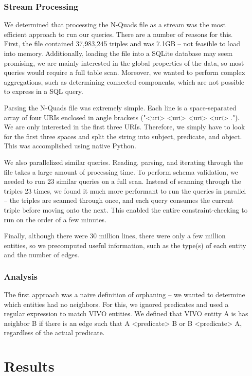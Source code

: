 \documentclass[11pt]{article}
\begin{document}
\subsubsection*{Stream Processing}
We determined that processing the N-Quads file as a stream was the most efficient approach to run our queries. There are a number of reasons for this. First, the file contained 37,983,245 triples and was 7.1GB -- not feasible to load into memory. Additionally, loading the file into a SQLite database may seem promising, we are mainly interested in the global properties of the data, so most queries would require a full table scan. Moreover, we wanted to perform complex aggregations, such as determining connected components, which are not possible to express in a SQL query.

Parsing the N-Quads file was extremely simple. Each line is a space-separated array of four URIs enclosed in angle brackets ("<uri> <uri> <uri> <uri> ."). We are only interested in the first three URIs. Therefore, we simply have to look for the first three spaces and split the string into subject, predicate, and object. This was accomplished using native Python.

We also parallelized similar queries. Reading, parsing, and iterating through the file takes a large amount of processing time. To perform schema validation, we needed to run 23 similar queries on a full scan. Instead of scanning through the triples 23 times, we found it much more performant to run the queries in parallel -- the triples are scanned through once, and each query consumes the current triple before moving onto the next. This enabled the entire constraint-checking to run on the order of a few minutes.

Finally, although there were 30 million lines, there were only a few million entities, so we precomputed useful information, such as the type(s) of each entity and the number of edges.

\subsubsection*{Analysis}
The first approach was a naive definition of orphaning -- we wanted to determine which entities had no neighbors. For this, we ignored predicates and used a regular expression to match VIVO entities. We defined that VIVO entity A is has neighbor B if there is an edge such that A <predicate> B or B <predicate> A, regardless of the actual predicate. 

\section*{Results}
\end{document}
